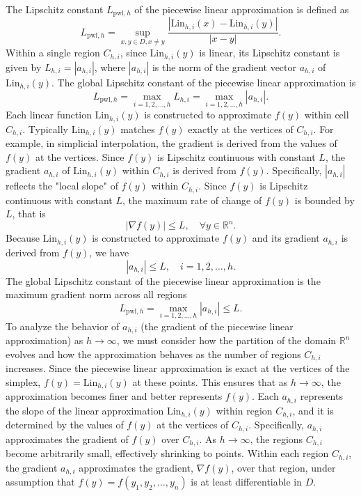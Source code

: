 \documentclass[preprint,12pt]{elsarticle}
\begin{document}
The Lipschitz constant \( L_{\text{pwl},h} \) of the piecewise linear approximation is defined as
\[
L_{\text{pwl},h} = \sup_{x,y \in D, x \neq y} \frac{|\text{Lin}_{h,i}({x}) - \text{Lin}_{h,i}({y})|}{|x - y|}.
\]
Within a single region \( C_{h,i} \), since \( \text{Lin}_{h,i}(y) \) is linear, its Lipschitz constant is given by $L_{h,i} = |{a}_{h,i}|$,
where \( |{a}_{h,i}| \) is the norm of the gradient vector \( {a}_{h,i}\) of \( \text{Lin}_{h,i}({y}) \). The global Lipschitz constant of the piecewise linear approximation is
\[
L_{\text{pwl},h} = \max_{i=1,2,\dots,h} L_{h,i} = \max_{i=1,2,\dots,h} |{a}_{h,i}|.
\]
Each linear function \( \text{Lin}_{h,i}({y}) \) is constructed to approximate \( f(y) \) within cell \( C_{h,i} \). Typically
 \( \text{Lin}_{h,i}({y}) \) matches \( f(y) \) exactly at the vertices of \(  C_{h,i} \).
For example, in simplicial interpolation, the gradient is derived from the values of \( f({y}) \) at the vertices.
Since \( f({y}) \) is Lipschitz continuous with constant \( L \), the gradient \( {a}_{h,i} \) of \( \text{Lin}_{h,i}({y}) \) within \( C_{h,i} \) is derived from \( f(y) \). Specifically, \( |{a}_{h,i}| \) reflects the "local slope" of \( f(y) \) within \( C_{h,i}\). Since \( f(y) \) is Lipschitz continuous with constant \( L \), the maximum rate of change of \( f(y) \) is bounded by \( L \), that is
\[
|\nabla f(y)| \leq L, \quad \forall y \in \mathbb{R}^n.
\]
Because \( \text{Lin}_{h,i}({y}) \) is constructed to approximate \( f(y) \) and its gradient \( {a}_{h,i} \) is derived from \( f(y) \), we have
\[
|{a}_{h,i}| \leq L, \quad  i=1,2,\dots,h.
\]
The global Lipschitz constant of the piecewise linear approximation is the maximum gradient norm across all regions
\[
L_{\text{pwl},h} = \max_{i=1,2,\dots,h} |{a}_{h,i}|\leq L.
\]
To analyze the behavior of \( {a}_{h,i} \) (the gradient of the piecewise linear approximation) as \(h \to \infty \), we must consider how the partition of the domain \( \mathbb{R}^n \) evolves and how the approximation behaves as the number of regions \( C_{h,i} \) increases. 
Since the piecewise linear approximation is exact at the vertices of the simplex, \( f(y) = \text{Lin}_{h,i}({y}) \) at these points. This ensures that as \( h \to \infty \), the approximation becomes finer and better represents \( f(y) \).
Each \( {a}_{h,i} \) represents the slope of the linear approximation \( \text{Lin}_{h,i}({y}) \) within region \( C_{h,i} \), and it is determined by the values of \( f(y) \) at the vertices of \( C_{h,i} \). Specifically, \( {a}_{h,i} \) approximates the gradient of \( f(y) \) over \( C_{h,i} \). As \( h \to \infty \), the regions \( C_{h,i} \) become arbitrarily small, effectively shrinking to points. Within each region \( C_{h,i} \), the gradient \( {a}_{h,i} \) approximates the gradient, \( \nabla f(y) \), over that region, under assumption that $f(y)=f(y_1,y_2,\dots,y_n)$ is at least differentiable in $D$.  
\end{document}
